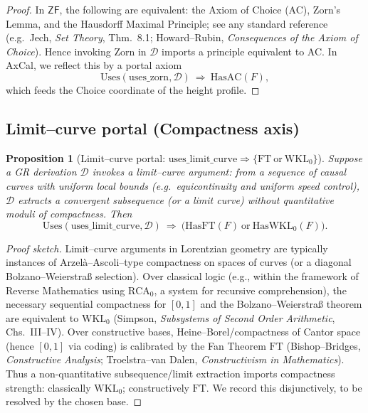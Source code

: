 \documentclass[11pt]{article}
\newtheorem{proposition}[theorem]{Proposition}
\theoremstyle{definition}
\theoremstyle{remark}
\newcommand{\ZF}{\mathsf{ZF}}
\newcommand{\FT}{\mathrm{FT}}
\newcommand{\WKLz}{\mathrm{WKL}_0}
\newcommand{\RCA}{\mathrm{RCA}}
\begin{document}
\begin{proof}
In $\ZF$, the following are equivalent: the Axiom of Choice (AC), Zorn's Lemma, and the Hausdorff Maximal Principle; see any standard reference (e.g.\ Jech, \emph{Set Theory}, Thm.~8.1; Howard–Rubin, \emph{Consequences of the Axiom of Choice}). Hence invoking Zorn in $\mathcal{D}$ imports a principle equivalent to AC. In AxCal, we reflect this by a portal axiom
\[
\mathrm{Uses}(\mathrm{uses\_zorn},\mathcal{D})\ \Rightarrow\ \mathrm{HasAC}(F),
\]
which feeds the Choice coordinate of the height profile. \qedhere
\end{proof}

\subsection{Limit–curve portal (Compactness axis)}

\begin{proposition}[Limit–curve portal: $\mathrm{uses\_limit\_curve}\Rightarrow\{\FT\ \text{or}\ \WKLz\}$]
\label{prop:limit-curve-portal}
Suppose a GR derivation $\mathcal{D}$ invokes a \emph{limit–curve} argument: from a sequence of causal curves with uniform local bounds (e.g.\ equicontinuity and uniform speed control), $\mathcal{D}$ extracts a convergent subsequence (or a limit curve) without quantitative moduli of compactness. Then
\[
\mathrm{Uses}(\mathrm{uses\_limit\_curve},\mathcal{D}) \ \Rightarrow\ \big(\mathrm{HasFT}(F)\ \text{or}\ \mathrm{HasWKL}_0(F)\big).
\]
\end{proposition}

\begin{proof}[Proof sketch]
Limit–curve arguments in Lorentzian geometry are typically instances of Arzelà–Ascoli–type compactness on spaces of curves (or a diagonal Bolzano–Weierstraß selection). Over classical logic (e.g., within the framework of Reverse Mathematics using $\RCA_0$, a system for recursive comprehension), the necessary sequential compactness for $[0,1]$ and the Bolzano–Weierstraß theorem are equivalent to $\WKLz$ (Simpson, \emph{Subsystems of Second Order Arithmetic}, Chs.~III–IV). Over constructive bases, Heine–Borel/compactness of Cantor space (hence $[0,1]$ via coding) is calibrated by the Fan Theorem $\FT$ (Bishop–Bridges, \emph{Constructive Analysis}; Troelstra–van Dalen, \emph{Constructivism in Mathematics}). Thus a non-quantitative subsequence/limit extraction imports compactness strength: classically $\WKLz$; constructively $\FT$. We record this disjunctively, to be resolved by the chosen base. \qedhere
\end{proof}
\end{document}
